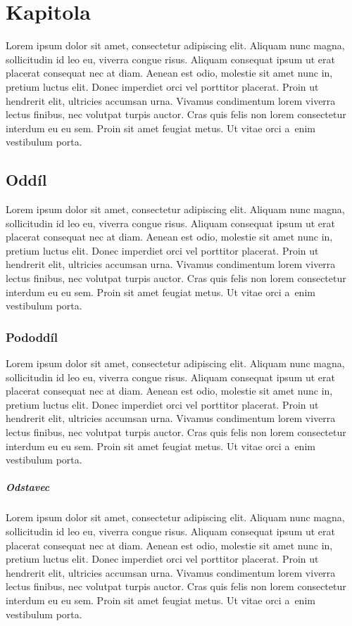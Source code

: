 \chapter{Kapitola}
Lorem ipsum dolor sit amet, consectetur adipiscing elit.
Aliquam nunc magna, sollicitudin id leo eu, viverra congue risus.
Aliquam consequat ipsum ut erat placerat consequat nec at diam. 
Aenean est odio, molestie sit amet nunc in, pretium luctus elit. 
Donec imperdiet orci vel porttitor placerat. 
Proin ut hendrerit elit, ultricies accumsan urna. 
Vivamus condimentum lorem viverra lectus finibus, nec volutpat turpis auctor.
Cras quis felis non lorem consectetur interdum eu eu sem. 
Proin sit amet feugiat metus. 
Ut vitae orci a~enim vestibulum porta. 

\fxnote[author=JA]{\textcolor{mygreen}{Muj Komentar}}

\section{Oddíl}
Lorem ipsum dolor sit amet, consectetur adipiscing elit.
Aliquam nunc magna, sollicitudin id leo eu, viverra congue risus.
Aliquam consequat ipsum ut erat placerat consequat nec at diam. 
Aenean est odio, molestie sit amet nunc in, pretium luctus elit. 
Donec imperdiet orci vel porttitor placerat. 
Proin ut hendrerit elit, ultricies accumsan urna. 
Vivamus condimentum lorem viverra lectus finibus, nec volutpat turpis auctor.
Cras quis felis non lorem consectetur interdum eu eu sem. 
Proin sit amet feugiat metus. 
Ut vitae orci a~enim vestibulum porta. 

\subsection{Pododdíl}
Lorem ipsum dolor sit amet, consectetur adipiscing elit.
Aliquam nunc magna, sollicitudin id leo eu, viverra congue risus.
Aliquam consequat ipsum ut erat placerat consequat nec at diam. 
Aenean est odio, molestie sit amet nunc in, pretium luctus elit. 
Donec imperdiet orci vel porttitor placerat. 
Proin ut hendrerit elit, ultricies accumsan urna. 
Vivamus condimentum lorem viverra lectus finibus, nec volutpat turpis auctor.
Cras quis felis non lorem consectetur interdum eu eu sem. 
Proin sit amet feugiat metus. 
Ut vitae orci a~enim vestibulum porta. 

\paragraph{Odstavec}
Lorem ipsum dolor sit amet, consectetur adipiscing elit.
Aliquam nunc magna, sollicitudin id leo eu, viverra congue risus.
Aliquam consequat ipsum ut erat placerat consequat nec at diam. 
Aenean est odio, molestie sit amet nunc in, pretium luctus elit. 
Donec imperdiet orci vel porttitor placerat. 
Proin ut hendrerit elit, ultricies accumsan urna. 
Vivamus condimentum lorem viverra lectus finibus, nec volutpat turpis auctor.
Cras quis felis non lorem consectetur interdum eu eu sem. 
Proin sit amet feugiat metus. 
Ut vitae orci a~enim vestibulum porta. 

